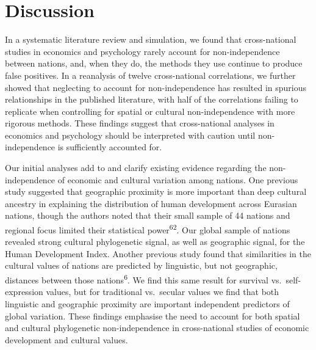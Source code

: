 \documentclass[
  man,floatsintext]{apa6}
\begin{document}
\hypertarget{discussion}{%
\section{Discussion}\label{discussion}}

In a systematic literature review and simulation, we found that cross-national studies in economics and psychology rarely account for non-independence between nations, and, when they do, the methods they use continue to produce false positives. In a reanalysis of twelve cross-national correlations, we further showed that neglecting to account for non-independence has resulted in spurious relationships in the published literature, with half of the correlations failing to replicate when controlling for spatial or cultural non-independence with more rigorous methods. These findings suggest that cross-national analyses in economics and psychology should be interpreted with caution until non-independence is sufficiently accounted for.

Our initial analyses add to and clarify existing evidence regarding the non-independence of economic and cultural variation among nations. One previous study suggested that geographic proximity is more important than deep cultural ancestry in explaining the distribution of human development across Eurasian nations, though the authors noted that their small sample of 44 nations and regional focus limited their statistical power\textsuperscript{62}. Our global sample of nations revealed strong cultural phylogenetic signal, as well as geographic signal, for the Human Development Index. Another previous study found that similarities in the cultural values of nations are predicted by linguistic, but not geographic, distances between those nations\textsuperscript{6}. We find this same result for survival vs.~self-expression values, but for traditional vs.~secular values we find that both linguistic and geographic proximity are important independent predictors of global variation. These findings emphasise the need to account for both spatial and cultural phylogenetic non-independence in cross-national studies of economic development and cultural values.
\end{document}
